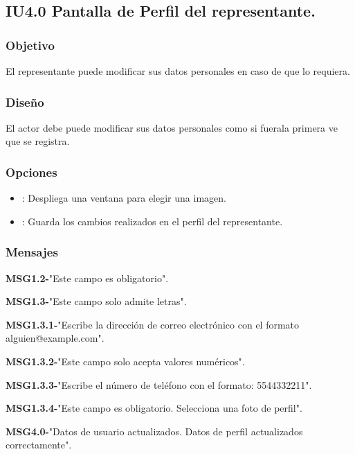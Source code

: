 \subsection{IU4.0 Pantalla de Perfil del representante.}

\subsubsection{Objetivo}
	El representante puede modificar sus datos personales en caso de que lo requiera.

\subsubsection{Diseño}
  El actor debe puede modificar sus datos personales como si fuerala primera ve que se registra.


\subsubsection{Opciones}
\begin{itemize}
	\item {}: Despliega una ventana para elegir una imagen.
	\item {}: Guarda los cambios realizados en el perfil del representante.
  \end{itemize}

\subsubsection{Mensajes}
	\begin{Citemize}
		\item {\bf MSG1.2-}"Este campo es obligatorio".
		\item {\bf MSG1.3-}"Este campo solo admite letras".
		\item {\bf MSG1.3.1-}"Escribe la dirección de correo electrónico con el formato alguien@example.com".
		\item {\bf MSG1.3.2-}"Este campo solo acepta valores numéricos".
		\item {\bf MSG1.3.3-}"Escribe el número de teléfono con el formato: 5544332211".
		\item {\bf MSG1.3.4-}"Este campo es obligatorio. Selecciona una foto de perfil".
		\item {\bf MSG4.0-}"Datos de usuario actualizados. Datos de perfil actualizados correctamente".
	\end{Citemize}